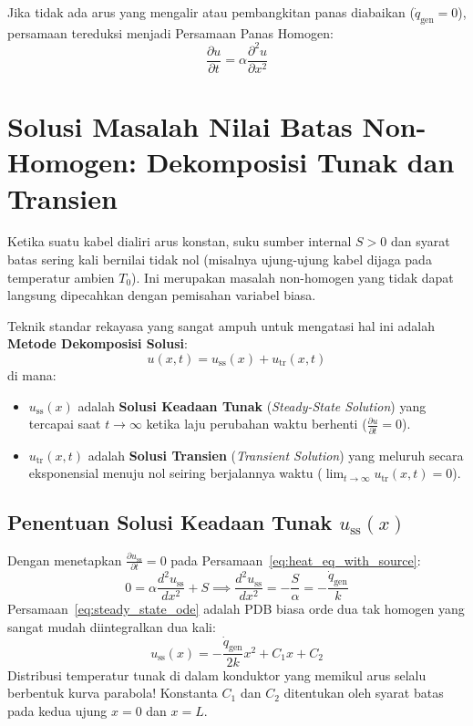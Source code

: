 \documentclass[11pt,a4paper]{article}
\theoremstyle{definition}
\begin{document}
Jika tidak ada arus yang mengalir atau pembangkitan panas diabaikan ($\dot{q}_{\text{gen}} = 0$), persamaan tereduksi menjadi Persamaan Panas Homogen:
\begin{equation}
    \frac{\partial u}{\partial t} = \alpha \frac{\partial^2 u}{\partial x^2}
    \label{eq:heat_eq_homo}
\end{equation}

\section{Solusi Masalah Nilai Batas Non-Homogen: Dekomposisi Tunak dan Transien}

Ketika suatu kabel dialiri arus konstan, suku sumber internal $S > 0$ dan syarat batas sering kali bernilai tidak nol (misalnya ujung-ujung kabel dijaga pada temperatur ambien $T_0$). Ini merupakan masalah non-homogen yang tidak dapat langsung dipecahkan dengan pemisahan variabel biasa.

Teknik standar rekayasa yang sangat ampuh untuk mengatasi hal ini adalah \textbf{Metode Dekomposisi Solusi}:
\begin{equation}
    u(x, t) = u_{\text{ss}}(x) + u_{\text{tr}}(x, t)
    \label{eq:steady_transient_decomp}
\end{equation}
di mana:
\begin{itemize}[leftmargin=*]
    \item $u_{\text{ss}}(x)$ adalah \textbf{Solusi Keadaan Tunak} (\textit{Steady-State Solution}) yang tercapai saat $t \to \infty$ ketika laju perubahan waktu berhenti ($\frac{\partial u}{\partial t} = 0$).
    \item $u_{\text{tr}}(x, t)$ adalah \textbf{Solusi Transien} (\textit{Transient Solution}) yang meluruh secara eksponensial menuju nol seiring berjalannya waktu ($\lim_{t \to \infty} u_{\text{tr}}(x, t) = 0$).
\end{itemize}

\subsection{Penentuan Solusi Keadaan Tunak \texorpdfstring{$u_{\text{ss}}(x)$}{u-ss(x)}}
Dengan menetapkan $\frac{\partial u_{\text{ss}}}{\partial t} = 0$ pada Persamaan~\eqref{eq:heat_eq_with_source}:
\begin{equation}
    0 = \alpha \frac{d^2 u_{\text{ss}}}{dx^2} + S \implies \frac{d^2 u_{\text{ss}}}{dx^2} = -\frac{S}{\alpha} = -\frac{\dot{q}_{\text{gen}}}{k}
    \label{eq:steady_state_ode}
\end{equation}
Persamaan~\eqref{eq:steady_state_ode} adalah PDB biasa orde dua tak homogen yang sangat mudah diintegralkan dua kali:
\begin{equation}
    u_{\text{ss}}(x) = -\frac{\dot{q}_{\text{gen}}}{2k} x^2 + C_1 x + C_2
    \label{eq:steady_parabola}
\end{equation}
Distribusi temperatur tunak di dalam konduktor yang memikul arus selalu berbentuk kurva parabola! Konstanta $C_1$ dan $C_2$ ditentukan oleh syarat batas pada kedua ujung $x = 0$ dan $x = L$.
\end{document}
